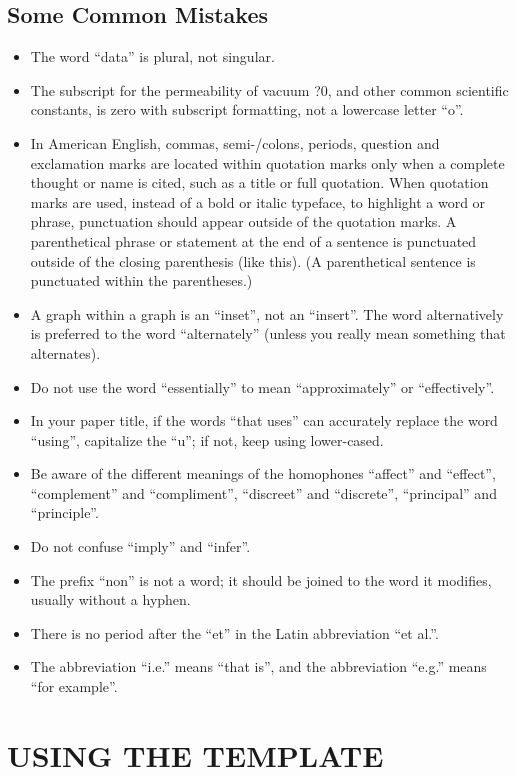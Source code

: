 \documentclass[spanish, letterpaper, 12 pt, conference]{ieeeconf}  %
\begin{document}
\subsection{Some Common Mistakes}
\begin{itemize}


\item The word ``data'' is plural, not singular.
\item The subscript for the permeability of vacuum ?0, and other common scientific constants, is zero with subscript formatting, not a lowercase letter ``o''.
\item In American English, commas, semi-/colons, periods, question and exclamation marks are located within quotation marks only when a complete thought or name is cited, such as a title or full quotation. When quotation marks are used, instead of a bold or italic typeface, to highlight a word or phrase, punctuation should appear outside of the quotation marks. A parenthetical phrase or statement at the end of a sentence is punctuated outside of the closing parenthesis (like this). (A parenthetical sentence is punctuated within the parentheses.)
\item A graph within a graph is an ``inset'', not an ``insert''. The word alternatively is preferred to the word ``alternately'' (unless you really mean something that alternates).
\item Do not use the word ``essentially'' to mean ``approximately'' or ``effectively''.
\item In your paper title, if the words ``that uses'' can accurately replace the word ``using'', capitalize the ``u''; if not, keep using lower-cased.
\item Be aware of the different meanings of the homophones ``affect'' and ``effect'', ``complement'' and ``compliment'', ``discreet'' and ``discrete'', ``principal'' and ``principle''.
\item Do not confuse ``imply'' and ``infer''.
\item The prefix ``non'' is not a word; it should be joined to the word it modifies, usually without a hyphen.
\item There is no period after the ``et'' in the Latin abbreviation ``et al.''.
\item The abbreviation ``i.e.'' means ``that is'', and the abbreviation ``e.g.'' means ``for example''.

\end{itemize}


\section{USING THE TEMPLATE}
\end{document}
